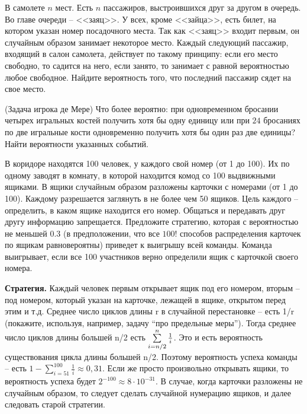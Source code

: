 \begin{problem}
В самолете $n$ мест. Есть $n$ пассажиров, выстроившихся друг за другом в очередь. Во главе очереди -- <<заяц>>. У всех, 
кроме <<зайца>>, есть билет, на котором указан номер посадочного места. Так как <<заяц>> входит первым, он случайным образом занимает 
некоторое место. Каждый следующий пассажир, входящий в салон самолета, действует по такому принципу: если его место свободно, то 
садится на него, если занято, то занимает с равной вероятностью любое свободное. Найдите вероятность того, что последний пассажир 
сядет на свое место. 
\end{problem}

\begin{problem}
(Задача игрока де Мере) 
Что более вероятно: при одновременном бросании четырех игральных костей получить хотя бы одну единицу или при $24$ бросаниях 
по две игральные кости одновременно получить хотя бы один раз две единицы? Найти вероятности указанных событий. 
\end{problem}

\begin{problem}
В коридоре находятся 100 человек, у каждого свой номер (от 1 до 100). Их по одному заводят в комнату, в которой 
находится комод со 100 выдвижными ящиками. В ящики случайным образом 
разложены карточки с номерами (от 1 до 100). Каждому разрешается заглянуть в 
не более чем 50 ящиков. Цель каждого -- определить, в каком ящике находится 
его номер. Общаться и передавать друг другу информацию запрещается. 
Предложите стратегию, которая с вероятностью не меньшей $0.3$ (в 
предположении, что все $100!$ способов распределения карточек по ящикам 
равновероятны) приведет к выигрышу всей команды. Команда выигрывает, если 
все 100 участников верно определили ящик с карточкой своего номера.
\end{problem}

\textbf{Стратегия. }Каждый человек первым открывает ящик под его номером, 
вторым -- под номером, который указан на карточке, лежащей в ящике, открытом 
перед этим и т.д. Среднее число циклов длины r в случайной 
перестановке -- есть 1/r (покажите, используя, например, задачу ``про 
предельные меры''). Тогда среднее число циклов длины большей n/2 
есть $\sum\limits_{i=n \mathord{\left/ {\vphantom {n 2}} \right. 
\kern-\nulldelimiterspace} 2}^n {\frac{1}{i}} $. Это и есть вероятность 
существования цикла длины большей n/2. Поэтому вероятность успеха команды -- 
есть $1-\sum\limits_{i=51}^{100} {\frac{1}{i}} \approx 0,31$. Если 
же просто произвольно открывать ящики, то вероятность успеха будет 
$2^{-100}\approx 8\cdot 10^{-31}$. В случае, когда карточки 
разложены не случайным образом, то следует сделать случайной нумерацию 
ящиков, и далее следовать старой стратегии.